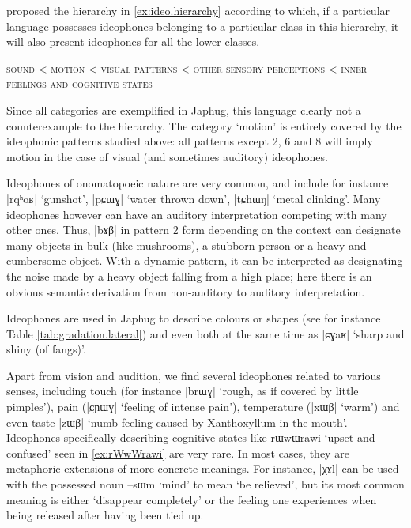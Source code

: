 \documentclass[oldfontcommands,oneside,a4paper,11pt]{article}
\newcommand{\ipa}[1]{{\phon \mbox{#1}}} %
\begin{document}
\citet[663]{dingemanse12ideo} proposed the hierarchy in \ref{ex:ideo.hierarchy} according to which, if a particular language possesses ideophones belonging to a particular class in this hierarchy, it will also present ideophones for all the lower classes.
  \begin{exe} 
\ex  \label{ex:ideo.hierarchy}
\glt \textsc{sound} < \textsc{motion} < \textsc{visual patterns}  < \textsc{other sensory perceptions} < \textsc{inner feelings and cognitive states}
  \end{exe}
Since all categories are exemplified in Japhug, this language clearly not a counterexample to the hierarchy. The category  `motion' is entirely covered by the  ideophonic patterns studied above: all patterns except 2, 6 and 8 will imply motion in the case of visual (and sometimes auditory) ideophones.

 Ideophones of onomatopoeic nature  are very common, and include for instance   |\ipa{rqʰoʁ}| `gunshot', |\ipa{pɕɯɣ}| `water thrown down', |\ipa{tɕhɯŋ}| `metal clinking'. Many ideophones however can have an auditory interpretation competing with many other ones. Thus, |\ipa{bɤβ}| in pattern 2 form depending on the context can designate many objects in bulk (like mushrooms), a stubborn person or a heavy and cumbersome object. With a dynamic   pattern, it can be interpreted as designating the noise made by a heavy object falling from a high place; here there is an obvious semantic derivation from non-auditory to auditory interpretation.
 
Ideophones are used in Japhug to describe colours or shapes (see for instance Table  \ref{tab:gradation.lateral}) and even both at the same time as |\ipa{ɕɣaʁ}| `sharp and shiny (of fangs)'.
 
 Apart from vision and audition, we find several ideophones related to various senses, including touch (for instance |\ipa{brɯɣ}|  `rough, as if covered by little pimples'), pain (|\ipa{ɕɲɯɣ}| `feeling of intense pain'), temperature (|\ipa{xɯβ}| `warm') and even taste |\ipa{zɯβ}| `numb feeling caused by Xanthoxyllum in the mouth'.  
 Ideophones specifically describing cognitive states like \ipa{rɯwɯrawi}  `upset and confused' seen in \ref{ex:rWwWrawi} are very rare. In most cases, they are metaphoric extensions of more concrete meanings. For instance, |\ipa{χɤl}|  can be used with the possessed noun \ipa{--sɯm} `mind' to mean `be relieved', but its most common meaning is either `disappear completely' or the feeling one experiences when being released after having been tied up.
  
\end{document}
